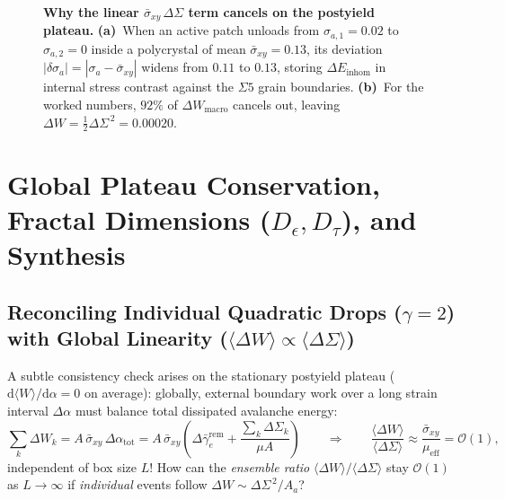 \documentclass[11pt,a4paper]{article}
\newcommand{\dS}{\Delta\Sigma}
\newcommand{\dW}{\Delta W}
\newcommand{\sigbar}{\bar{\sigma}_{xy}}
\begin{document}
\begin{figure}[ht!]
{%
}
\caption{\textbf{Why the linear $\sigbar\,\dS$ term cancels on the postyield plateau.} \textbf{(a)}~When an active patch unloads from $\sigma_{a,1}=0.02$ to $\sigma_{a,2}=0$ inside a polycrystal of mean $\sigbar=0.13$, its deviation $|\delta\sigma_a|=|\sigma_a-\sigbar|$ widens from $0.11$ to $0.13$, storing $\Delta E_{\mathrm{inhom}}$ in internal stress contrast against the $\Sigma 5$ grain boundaries. \textbf{(b)}~For the worked numbers, $92\%$ of $\Delta W_{\mathrm{macro}}$ cancels out, leaving $\dW = \frac{1}{2}\dS^{\,2} = 0.00020$.}
\label{fig:variance_check}
\end{figure}

\section{Global Plateau Conservation, Fractal Dimensions (\texorpdfstring{$D_\epsilon, D_\tau$}{D\_eps, D\_tau}), and Synthesis}
\label{sec:global_balance}

\subsection{Reconciling Individual Quadratic Drops (\texorpdfstring{$\gamma=2$}{gamma=2}) with Global Linearity (\texorpdfstring{$\langle\dW\rangle \propto \langle\dS\rangle$}{<Delta W> propto <Delta Sigma>})}

A subtle consistency check arises on the stationary postyield plateau ($\mathrm{d}\langle W\rangle/\mathrm{d}\alpha = 0$ on average): globally, external boundary work over a long strain interval $\Delta\alpha$ must balance total dissipated avalanche energy:
\begin{equation}
\sum_{k} \Delta W_k = A\,\sigbar\,\Delta\alpha_{\mathrm{tot}}
= A\,\sigbar\left(\Delta\bar{\gamma}_e^{\mathrm{rem}} + \frac{\sum_k \Delta\Sigma_k}{\mu A}\right)
\qquad\Longrightarrow\qquad
\frac{\langle \dW \rangle}{\langle \dS \rangle} \approx \frac{\sigbar}{\mu_{\mathrm{eff}}} = \mathcal{O}(1),
\end{equation}
independent of box size $L$! How can the \emph{ensemble ratio} $\langle \dW \rangle / \langle \dS \rangle$ stay $\mathcal{O}(1)$ as $L\to\infty$ if \emph{individual} events follow $\dW \sim \dS^{\,2}/A_a$?
\end{document}

